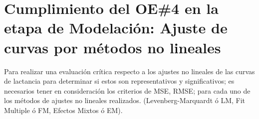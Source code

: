  


\section{Cumplimiento del OE\#4 en la etapa de Modelación: Ajuste de curvas por métodos no lineales}

\begin{table}[H]
\centering
\caption{Comparación de error cuadrático medio (MSE) para cada método de ajuste no lineal.}
\label{msecompare}
\end{table}
\pagebreak

Para realizar una evaluación crítica respecto a los ajustes no lineales de las curvas de lactancia para determinar si estos son representativos y significativos; es necesarios tener en consideración los criterios de MSE, RMSE; para cada uno de los métodos de ajustes no lineales realizados. (Levenberg-Marquardt ó LM, Fit Multiple ó FM, Efectos Mixtos ó EM). \\


